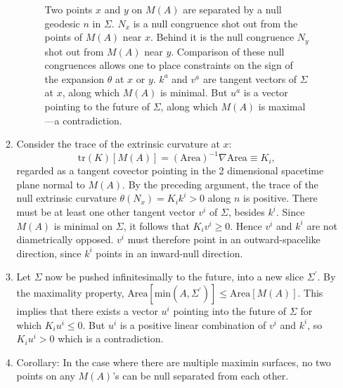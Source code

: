 \documentclass{article}
\begin{document}
\begin{enumerate}[resume]
\begin{enumerate}
\begin{figure}[hbt]
\caption{\footnotesize Two points $x$ and $y$ on $M(A)$ are separated by a null geodesic $n$ in $\Sigma$.  $N_x$ is a null congruence shot out from the points of $M(A)$ near $x$.  Behind it is the null congruence $N_y$ shot out from $M(A)$ near $y$.  Comparison of these null congruences allows one to place constraints on the sign of the expansion $\theta$ at $x$ or $y$.  $k^a$ and $v^a$ are tangent vectors of $\Sigma$ at $x$, along which $M(A)$ is minimal.  But $u^a$ is a vector pointing to the future of $\Sigma$, along which $M(A)$ is maximal---a contradiction.}\label{nulls}
\end{figure}
	\item  Consider the trace of the extrinsic curvature at $x$:
\begin{equation}\label{Ki}
\mathrm{tr}(K)[M(A)] = (\mathrm{Area})^{-1} \nabla \mathrm{Area} \equiv K_i,
\end{equation}
regarded as a tangent covector pointing in the 2 dimensional spacetime plane normal to $M(A)$.  By the preceding argument, the trace of the null extrinsic curvature $\theta(N_x) = K_i k^i > 0$ along $n$ is positive.  There must be at least one other tangent vector $v^i$ of $\Sigma$, besides $k^i$.  Since $M(A)$ is minimal on $\Sigma$, it follows that $K_i v^i \ge 0$.  Hence $v^i$ and $k^i$ are not diametrically opposed.  $v^i$ must therefore point in an outward-spacelike direction, since $k^i$ points in an inward-null direction.
	\item Let $\Sigma$ now be pushed infinitesimally to the future, into a new slice $\Sigma^\prime$.  By the maximality property, $\mathrm{Area}[\mathrm{min}(A,\Sigma^\prime)] \le \mathrm{Area}[M(A)]$.  This implies that there exists a vector $u^i$ pointing into the future of $\Sigma$ for which $K_i u^i \le 0$.  But $u^i$ is a positive linear combination of $v^i$ and $k^i$, so $K_i u^i > 0$ which is a contradiction.  
	\item Corollary: In the case where there are multiple maximin surfaces, no two points on any $M(A)$'s can be null separated from each other.
	\end{enumerate}


\end{enumerate}
\end{document}
